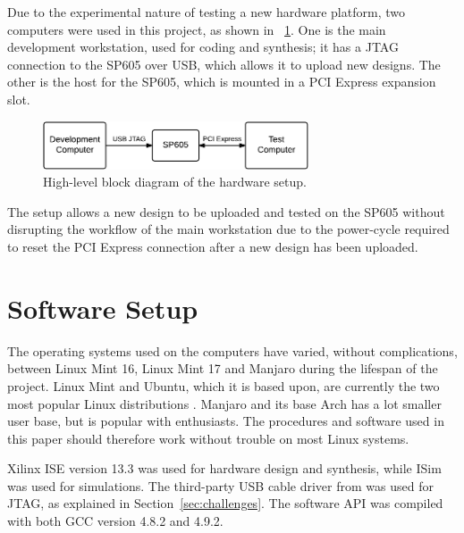 Due to the experimental nature of testing a new hardware platform, two computers were used in this project, as shown in \figurename~\ref{fig:hardware-setup}.
One is the main development workstation, used for coding and synthesis; it has a JTAG connection to the SP605 over USB, which allows it to upload new designs.
The other is the host for the SP605, which is mounted in a PCI Express expansion slot.

\begin{figure}[!ht]
    \centering
    \includegraphics[width=0.70\textwidth]{figures/hardware-setup}
    \caption[Hardware setup]{
        High-level block diagram of the hardware setup.
    }
    \label{fig:hardware-setup}
\end{figure}

The setup allows a new design to be uploaded and tested on the SP605 without disrupting the workflow of the main workstation due to the power-cycle required to reset the PCI Express connection after a new design has been uploaded.

\section{Software Setup}

The operating systems used on the computers have varied, without complications, between Linux Mint 16, Linux Mint 17 and Manjaro during the lifespan of the project.
Linux Mint and Ubuntu, which it is based upon, are currently the two most popular Linux distributions \cite{distrowatch}.
Manjaro and its base Arch has a lot smaller user base, but is popular with enthusiasts.
The procedures and software used in this paper should therefore work without trouble on most Linux systems.

Xilinx ISE version 13.3 was used for hardware design and synthesis, while ISim was used for simulations.
The third-party USB cable driver from \cite{usbdriver} was used for JTAG, as explained in Section~\ref{sec:challenges}.
The software API was compiled with both GCC version 4.8.2 and 4.9.2.

